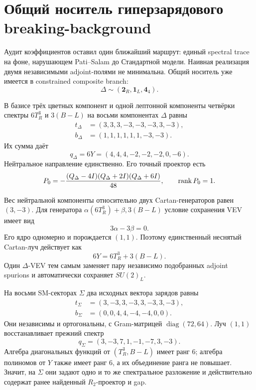 \chapter{Общий носитель гиперзарядового breaking-background}
\label{ch:v10-h15-r2-hypercharge-background-carrier}

Аудит коэффициентов оставил один ближайший маршрут: единый spectral trace
на фоне, нарушающем Pati--Salam до Стандартной модели. Наивная реализация
двумя независимыми adjoint-полями не минимальна. Общий носитель уже имеется
в constrained composite branch:
\begin{equation}
 \boxed{\Delta\sim(\mathbf2_R,\mathbf1_L,\mathbf4_4)}.
\end{equation}

В базисе трёх цветных компонент и одной лептонной компоненты четвёрки
спектры $6T_R^3$ и $3(B-L)$ на восьми компонентах $\Delta$ равны
\begin{align}
 t_\Delta&=(3,3,3,-3,-3,-3,3,-3),\\
 b_\Delta&=(1,1,1,1,1,1,-3,-3).
\end{align}
Их сумма даёт
\begin{equation}
 q_\Delta=6Y=(4,4,4,-2,-2,-2,0,-6).
\end{equation}
Нейтральное направление единственно. Его точный проектор есть
\begin{equation}
 P_0=-\frac{(Q_\Delta-4I)(Q_\Delta+2I)(Q_\Delta+6I)}{48},
 \qquad \operatorname{rank} P_0=1.
\end{equation}

Вес нейтральной компоненты относительно двух Cartan-генераторов равен
$(3,-3)$. Для генератора $\alpha(6T_R^3)+\beta,3(B-L)$ условие сохранения
VEV имеет вид
\begin{equation}
 3\alpha-3\beta=0.
\end{equation}
Его ядро одномерно и порождается $(1,1)$. Поэтому единственный неснятый
Cartan-луч действует как
\begin{equation}
 \boxed{6Y=6T_R^3+3(B-L)}.
\end{equation}
Один $\Delta$-VEV тем самым заменяет пару независимо подобранных adjoint
spurions и автоматически сохраняет $SU(2)_L$.

На восьми SM-секторах $\Sigma$ два исходных вектора зарядов равны
\begin{align}
 t_\Sigma&=(3,-3,3,-3,3,-3,3,-3),\\
 b_\Sigma&=(0,0,4,4,-4,-4,0,0).
\end{align}
Они независимы и ортогональны, с Gram-матрицей
$\operatorname{diag}(72,64)$. Луч $(1,1)$ восстанавливает прежний спектр
\begin{equation}
 q_\Sigma=(3,-3,7,1,-1,-7,3,-3).
\end{equation}
Алгебра диагональных функций от $(T_R^3,B-L)$ имеет ранг $6$; алгебра
полиномов от $Y$ также имеет ранг $6$, а их объединение ранга не повышает.
Значит, на $\Sigma$ они задают одно и то же спектральное разложение и
действительно содержат ранее найденный $R_2$-проектор и gap.

